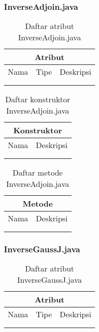 \subsubsection{InverseAdjoin.java}

\begin{table}[H]
    \centering
    \begin{tabular}{c|c|c}
        \hline
        \hline
        \multicolumn{3}{c}{\textbf{Atribut}}\\
        \hline
        \hline
         Nama & Tipe & Deskripsi \\
         \hline 
         \hline 
         &  & \\
         &  & \\
    \end{tabular}
    \caption{Daftar atribut InverseAdjoin.java}
\end{table}

\begin{table}[H]
    \centering
    \begin{tabular}{c|c}
        \hline
        \hline
        \multicolumn{2}{c}{\textbf{Konstruktor}}\\
        \hline
        \hline
         Nama  & Deskripsi \\
         \hline 
         \hline 
         &  \\
         &  \\
    \end{tabular}
    \caption{Daftar konstruktor InverseAdjoin.java}
\end{table}

\begin{table}[H]
    \centering
    \begin{tabular}{c|c}
        \hline
        \hline
        \multicolumn{2}{c}{\textbf{Metode}}\\
        \hline
        \hline
         Nama  & Deskripsi \\
         \hline 
         \hline 
         &  \\
         &  \\
    \end{tabular}
    \caption{Daftar metode InverseAdjoin.java}
\end{table}

\subsubsection{InverseGaussJ.java}

\begin{table}[H]
    \centering
    \begin{tabular}{c|c|c}
        \hline
        \hline
        \multicolumn{3}{c}{\textbf{Atribut}}\\
        \hline
        \hline
         Nama & Tipe & Deskripsi \\
         \hline 
         \hline 
         &  & \\
         &  & \\
    \end{tabular}
    \caption{Daftar atribut InverseGaussJ.java}
\end{table}

